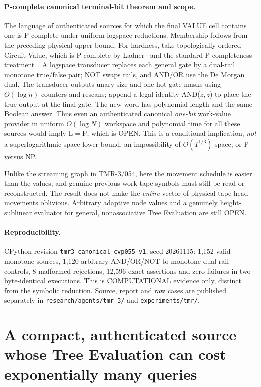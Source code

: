 \documentclass[11pt]{article}
\begin{document}
\paragraph{P-complete canonical terminal-bit theorem and scope.}
The language of authenticated sources for which the final VALUE
cell contains one is P-complete under uniform logspace reductions.
Membership follows from the preceding physical upper bound.
For hardness, take topologically ordered Circuit Value, which
is P-complete by Ladner~\cite{Ladner1975} and the standard
P-completeness treatment~\cite{GHR1995}. A logspace transducer
replaces each general gate by a dual-rail monotone true/false
pair; NOT swaps rails, and AND/OR use the De Morgan dual.
The transducer outputs unary size and one-hot gate masks using
$O(\log n)$ counters and rescans; append a legal identity
AND($z,z$) to place the true output at the final gate.
The new word has polynomial length and the same Boolean answer.
Thus even an authenticated canonical \emph{one-bit} work-value
provider in uniform $O(\log N)$ workspace and polynomial time
for all these sources would imply $\mathrm{L}=\mathrm{P}$,
which is OPEN. This is a conditional implication, \emph{not}
a superlogarithmic space lower bound, an impossibility of
$O(T^{1/3})$ space, or P versus NP.

Unlike the streaming graph in TMR-3/054, here the movement
schedule is easier than the values, and genuine previous
work-tape symbols must still be read or reconstructed.
The result does not make the \emph{entire} vector of physical
tape-head movements oblivious. Arbitrary adaptive node values
and a genuinely height-sublinear evaluator for general,
nonassociative Tree Evaluation are still OPEN.

\paragraph{Reproducibility.}
CPython revision \texttt{tmr3-canonical-cvp055-v1}, seed
20261115: 1,152 valid monotone sources, 1,120 arbitrary
AND/OR/NOT-to-monotone dual-rail controls, 8 malformed
rejections, 12,596 exact assertions and zero failures in
two byte-identical executions. This is COMPUTATIONAL
evidence only, distinct from the symbolic reduction.
Source, report and raw cases are published separately in
\texttt{research/agents/tmr-3/} and \texttt{experiments/tmr/}.

\section{A compact, authenticated source whose Tree Evaluation can cost exponentially many queries}
\end{document}
